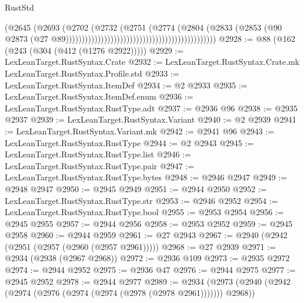 \begin{lexlean}{RustStd}
\begin{coremodule}
                                                                            (@2645
                                                                              (@2693
                                                                                (@2702
                                                                                  (@2732
                                                                                    (@2751
                                                                                      (@2774
                                                                                        (@2804
                                                                                          (@2833
                                                                                            (@2853
                                                                                              (@90
                                                                                                @2873
                                                                                                (@27
                                                                                                  @89)))))))))))))))))))))))))))))))))))))))))))))))
@2928 := @88 (@162 (@243 (@304 (@412 (@1276 @2922)))))
@2929 := LexLeanTarget.RustSyntax.Crate
@2932 := LexLeanTarget.RustSyntax.Crate.mk LexLeanTarget.RustSyntax.Profile.std
@2933 := LexLeanTarget.RustSyntax.ItemDef
@2934 := @2 @2933
@2935 := LexLeanTarget.RustSyntax.ItemDef.enum
@2936 := LexLeanTarget.RustSyntax.RustType.adt
@2937 := @2936 @96
@2938 := @2935 @2937
@2939 := LexLeanTarget.RustSyntax.Variant
@2940 := @2 @2939
@2941 := LexLeanTarget.RustSyntax.Variant.mk
@2942 := @2941 @96
@2943 := LexLeanTarget.RustSyntax.RustType
@2944 := @2 @2943
@2945 := LexLeanTarget.RustSyntax.RustType.list
@2946 := LexLeanTarget.RustSyntax.RustType.pair
@2947 := LexLeanTarget.RustSyntax.RustType.bytes
@2948 := @2946 @2947
@2949 := @2948 @2947
@2950 := @2945 @2949
@2951 := @2944 @2950
@2952 := LexLeanTarget.RustSyntax.RustType.str
@2953 := @2946 @2952
@2954 := LexLeanTarget.RustSyntax.RustType.bool
@2955 := @2953 @2954
@2956 := @2945 @2955
@2957 := @2944 @2956
@2958 := @2953 @2952
@2959 := @2945 @2958
@2960 := @2944 @2959
@2961 := @27 @2943
@2967 := @2940 (@2942 (@2951 (@2957 (@2960 (@2957 @2961)))))
@2968 := @27 @2939
@2971 := @2934 (@2938 (@2967 @2968))
@2972 := @2936 @109
@2973 := @2935 @2972
@2974 := @2944 @2952
@2975 := @2936 @47
@2976 := @2944 @2975
@2977 := @2945 @2952
@2978 := @2944 @2977
@2989 := @2934 (@2973 (@2940 (@2942 (@2974 (@2976 (@2974 (@2974 (@2978 (@2978 @2961))))))) @2968))

\end{coremodule}
\end{lexlean}
